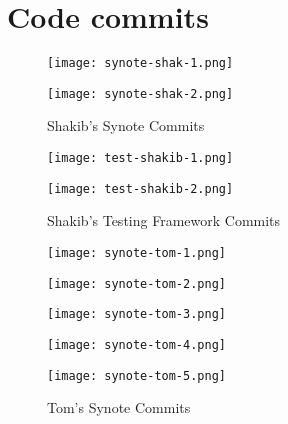 \chapter{Code commits}
\label{appendix:code-commits}

\begin{figure}[!hbt]
  	\centering
 	\texttt{[image: synote-shak-1.png]}
\end{figure}

\ContinuedFloat

\begin{figure}[!hbt]
  	\centering
 	\texttt{[image: synote-shak-2.png]}
  	\caption{Shakib's Synote Commits}
 	\label{fig:shakib-synote-commits}
\end{figure}

\begin{figure}[!hbt]
  	\centering
 	\texttt{[image: test-shakib-1.png]}
\end{figure}

\ContinuedFloat

\begin{figure}[!hbt]
  	\centering
 	\texttt{[image: test-shakib-2.png]}
  	\caption{Shakib's Testing Framework Commits}
 	\label{fig:shakib-testing-commits}
\end{figure}

\begin{figure}[!hbt]
  	\centering
 	\texttt{[image: synote-tom-1.png]}
\end{figure}

\ContinuedFloat

\begin{figure}[!hbt]
  	\centering
 	\texttt{[image: synote-tom-2.png]}
\end{figure}

\ContinuedFloat

\begin{figure}[!hbt]
  	\centering
 	\texttt{[image: synote-tom-3.png]}
\end{figure}

\ContinuedFloat

\begin{figure}[!hbt]
  	\centering
 	\texttt{[image: synote-tom-4.png]}
\end{figure}

\ContinuedFloat

\begin{figure}[!hbt]
  	\centering
 	\texttt{[image: synote-tom-5.png]}
  	\caption{Tom's Synote Commits}
 	\label{fig:tom-synote-commits}
\end{figure}

